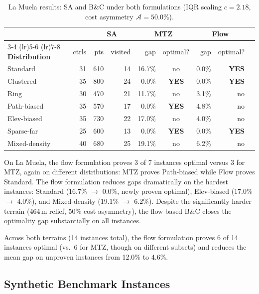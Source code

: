 \documentclass[preprint,11pt]{elsarticle}
\begin{document}
\begin{table}[H]
\centering
\caption{La Muela results: SA and B\&C under both formulations (IQR scaling $c = 2.18$, cost asymmetry $\mathcal{A} = 50.0\%$).}
\label{tab:lamuela}
\begin{tabular}{lrrrrcrrc}
\toprule
& & \multicolumn{2}{c}{\textbf{SA}} & \multicolumn{2}{c}{\textbf{MTZ}} & \multicolumn{2}{c}{\textbf{Flow}} \\
\cmidrule(lr){3-4} \cmidrule(lr){5-6} \cmidrule(lr){7-8}
\textbf{Distribution} & ctrls & pts & visited & gap & optimal? & gap & optimal? \\
\midrule
Standard        & 31 &  610 & 14 & 16.7\% & no  &  0.0\% & \textbf{YES} \\
Clustered       & 35 &  800 & 24 &  0.0\% & \textbf{YES} &  0.0\% & \textbf{YES} \\
Ring            & 30 &  470 & 21 & 11.7\% & no  &  3.1\% & no \\
Path-biased     & 35 &  570 & 17 &  0.0\% & \textbf{YES} &  4.8\% & no \\
Elev-biased     & 35 &  730 & 22 & 17.0\% & no  &  4.0\% & no \\
Sparse-far      & 25 &  600 & 13 &  0.0\% & \textbf{YES} &  0.0\% & \textbf{YES} \\
Mixed-density   & 40 &  680 & 25 & 19.1\% & no  &  6.2\% & no \\
\bottomrule
\end{tabular}
\end{table}

On La Muela, the flow formulation proves 3 of 7 instances optimal versus 3 for MTZ, again on different distributions: MTZ proves Path-biased while Flow proves Standard.
The flow formulation reduces gaps dramatically on the hardest instances: Standard (16.7\% $\to$ 0.0\%, newly proven optimal), Elev-biased (17.0\% $\to$ 4.0\%), and Mixed-density (19.1\% $\to$ 6.2\%).
Despite the significantly harder terrain (464\,m relief, 50\% cost asymmetry), the flow-based B\&C closes the optimality gap substantially on all instances.

Across both terrains (14 instances total), the flow formulation proves 6 of 14 instances optimal (vs.\ 6 for MTZ, though on different subsets) and reduces the mean gap on unproven instances from 12.0\% to 4.6\%.

\subsection{Synthetic Benchmark Instances}
\label{sec:benchmark}
\end{document}
